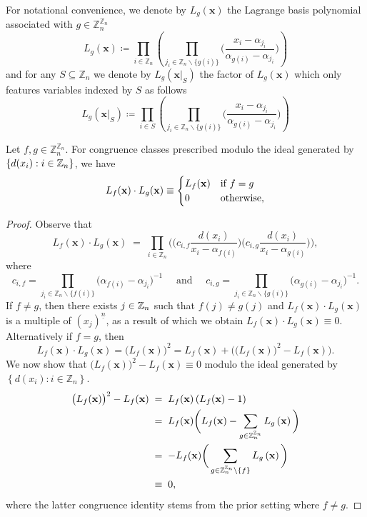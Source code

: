 For notational convenience, we denote by $L_{g}(\mathbf{x})$ the Lagrange basis polynomial associated with $g\in\mathbb{Z}_{n}^{\mathbb{Z}_{n}}$  
\[
L_{g}(\mathbf{x})\coloneq\prod_{i\in\mathbb{Z}_{n}}\left(\prod_{j_{i}\in\mathbb{Z}_{n}\backslash\{g(i)\}}\bigg(\frac{x_{i}-\alpha_{j_{i}}}{\alpha_{g(i)}-\alpha_{j_{i}}}\bigg)\right)
\]
and for any $S\subseteq \mathbb{Z}_n$ we denote  by $L_{g}(\mathbf{x}|_{S})$ the factor of $L_{g}(\mathbf{x})$ which only features variables indexed by $S$ as follows
\[
L_{g}(\mathbf{x}|_{S})\coloneq\prod_{i\in S}\left(\prod_{j_{i}\in\mathbb{Z}_{n}\backslash\{g(i)\}}\bigg(\frac{x_{i}-\alpha_{j_{i}}}{\alpha_{g(i)}-\alpha_{j_{i}}}\bigg)\right)
\]
\begin{proposition}
 \label{prop:Orthogonality}
 Let $f,g \in\mathbb{Z}_{n}^{\mathbb{Z}_{n}}$. For congruence classes prescribed modulo the ideal generated by $\{d(x_{i}):i \in {\mathbb Z}_n\}$, we have
\[
L_{f}({\bf x})\cdot L_{g}({\bf x})\equiv\begin{cases}
L_{f}({\bf x}) & \text{if }f=g\\
0 & \text{otherwise,}
\end{cases}
\]
\end{proposition}
\begin{proof} Observe that
\[
L_{f}(\mathbf{x})\cdot L_{g}(\mathbf{x})\;=\;\prod_{i\in\mathbb{Z}_{n}}\bigg(\big(c_{i,f}\frac{d(x_{i})}{x_{i}-\alpha_{f(i)}}\big)\big(c_{i,g}\frac{d(x_{i})}{x_{i}-\alpha_{g(i)}}\big)\bigg),
\]
where
\[
c_{i,f}=\prod_{j_{i}\in\mathbb{Z}_{n}\backslash\{f(i)\}}\big(\alpha_{f(i)}-\alpha_{j_{i}}\big)^{-1}\quad\text{ and }\quad c_{i,g}=\prod_{j_{i}\in\mathbb{Z}_{n}\backslash\{g(i)\}}\big(\alpha_{g(i)}-\alpha_{j_{i}}\big)^{-1}.
\]
If $f \neq g$, then there exists $j \in {\mathbb Z}_n$ such that $f(j)\neq g(j)$ and $L_{f}(\mathbf{x})\cdot L_{g}(\mathbf{x})$ is a multiple of $(x_{j})^{\underline{n}}$,
as a result of which we obtain $L_{f}(\mathbf{x})\cdot L_{g}(\mathbf{x}) \equiv 0$. Alternatively if $f = g$, then
\[
L_{f}(\mathbf{x})\cdot L_{g}(\mathbf{x})=\big(L_{f}(\mathbf{x})\big)^{2}=L_{f}(\mathbf{x})+\bigg(\big(L_{f}(\mathbf{x})\big)^{2}-L_{f}(\mathbf{x})\bigg).
\]
We now show that $\big(L_{f}(\mathbf{x})\big)^{2}-L_{f}(\mathbf{x})\equiv 0$ modulo the ideal generated by $\left\{ d(x_{i}):i\in\mathbb{Z}_{n}\right\}$.
\begin{align*}
\big(L_{f}(\mathbf{x})\big)^{2}-L_{f}(\mathbf{x})\; & =\;L_{f}(\mathbf{x})\left(L_{f}(\mathbf{x})-1\right)\\
 & =\;L_{f}(\mathbf{x})\bigg(L_{f}(\mathbf{x})-\sum_{g\in\mathbb{Z}_{n}^{\mathbb{Z}_{n}}}L_{g}\left({\bf x}\right)\bigg)\\
 & =\;-L_{f}(\mathbf{x})\bigg(\sum_{g\in\mathbb{Z}_{n}^{\mathbb{Z}_{n}}\setminus\{f\}}L_{g}\left({\bf x}\right)\bigg)\\
 & \equiv\;0,
\end{align*}
where the latter congruence identity stems from the prior setting where $f\ne g$.
\end{proof}
